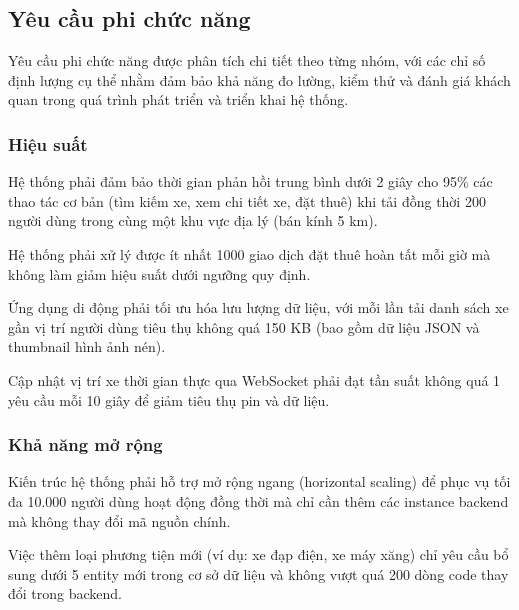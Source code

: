 \subsection{Yêu cầu phi chức năng}
Yêu cầu phi chức năng được phân tích chi tiết theo từng nhóm, với các chỉ số định lượng cụ thể nhằm đảm bảo khả năng đo lường, 
kiểm thử và đánh giá khách quan trong quá trình phát triển và triển khai hệ thống.

\subsubsection*{Hiệu suất}
Hệ thống phải đảm bảo thời gian phản hồi trung bình dưới 2 giây cho 95\% các thao tác cơ bản (tìm kiếm xe, xem chi tiết xe, đặt thuê) khi tải đồng thời 200 người dùng trong cùng một khu vực địa lý (bán kính 5 km). 

Hệ thống phải xử lý được ít nhất 1000 giao dịch đặt thuê hoàn tất mỗi giờ mà không làm giảm hiệu suất dưới ngưỡng quy định. 

Ứng dụng di động phải tối ưu hóa lưu lượng dữ liệu, với mỗi lần tải danh sách xe gần vị trí người dùng tiêu thụ không quá 150 KB (bao gồm dữ liệu JSON và thumbnail hình ảnh nén). 

Cập nhật vị trí xe thời gian thực qua WebSocket phải đạt tần suất không quá 1 yêu cầu mỗi 10 giây để giảm tiêu thụ pin và dữ liệu.

\subsubsection*{Khả năng mở rộng}
Kiến trúc hệ thống phải hỗ trợ mở rộng ngang (horizontal scaling) để phục vụ tối đa 10.000 người dùng hoạt động đồng thời mà chỉ cần thêm các instance backend mà không thay đổi mã nguồn chính. 

Việc thêm loại phương tiện mới (ví dụ: xe đạp điện, xe máy xăng) chỉ yêu cầu bổ sung dưới 5 entity mới trong cơ sở dữ liệu và không vượt quá 200 dòng code thay đổi trong backend. 

